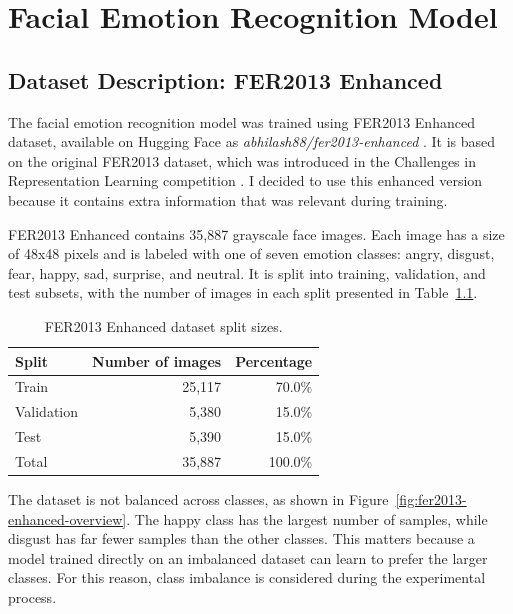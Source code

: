 \chapter{Facial Emotion Recognition Model}
\label{Chapter 3}

\section{Dataset Description: FER2013 Enhanced}

The facial emotion recognition model was trained using FER2013 Enhanced dataset, available on Hugging Face as \textit{abhilash88/fer2013-enhanced} \cite{fer2013_enhanced_2025}. It is based on the original FER2013 dataset, which was introduced in the Challenges in Representation Learning competition \cite{goodfellow2015challenges}. I decided to use this enhanced version because it contains extra information that was relevant during training.

FER2013 Enhanced contains 35,887 grayscale face images. Each image has a size of 48x48 pixels and is labeled with one of seven emotion classes: angry, disgust, fear, happy, sad, surprise, and neutral. It is split into training, validation, and test subsets, with the number of images in each split presented in Table~\ref{tab:fer2013-enhanced-splits}.

\begin{table}[h]
    \centering
    \begin{tabular}{lrr}
        \hline
        Split & Number of images & Percentage \\
        \hline
        Train & 25,117 & 70.0\% \\
        Validation & 5,380 & 15.0\% \\
        Test & 5,390 & 15.0\% \\
        \hline
        Total & 35,887 & 100.0\% \\
        \hline
    \end{tabular}
    \caption{FER2013 Enhanced dataset split sizes.}
    \label{tab:fer2013-enhanced-splits}
\end{table}

The dataset is not balanced across classes, as shown in Figure~\ref{fig:fer2013-enhanced-overview}. The happy class has the largest number of samples, while disgust has far fewer samples than the other classes. This matters because a model trained directly on an imbalanced dataset can learn to prefer the larger classes. For this reason, class imbalance is considered during the experimental process.

